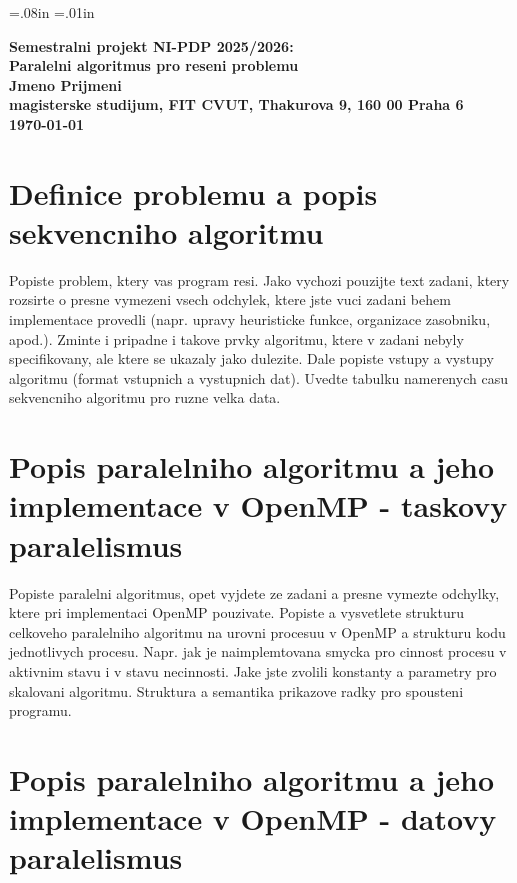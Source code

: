  \oddsidemargin=-5mm
\evensidemargin=-5mm\marginparwidth=.08in \marginparsep=.01in
\marginparpush=5pt\topmargin=-15mm\headheight=12pt
\headsep=25pt\footheight=12pt \footskip=30pt\textheight=25cm
\textwidth=17cm\columnsep=2mm
\columnseprule=1pt\parindent=15pt\parskip=2pt


\begin{center}
\bf Semestralni projekt NI-PDP 2025/2026:\\[5mm]
    Paralelni algoritmus pro reseni problemu\\[5mm] 
       Jmeno Prijmeni\\[2mm]
magisterske studijum, FIT CVUT, Thakurova 9, 160 00 Praha 6\\[2mm]
\today
\end{center}

\section{Definice problemu a popis sekvencniho algoritmu}

Popiste problem, ktery vas program resi. Jako vychozi pouzijte text
zadani, ktery rozsirte o presne vymezeni vsech odchylek, ktere jste
vuci zadani behem implementace provedli 
(napr.  upravy heuristicke funkce, organizace zasobniku,
apod.). Zminte i pripadne i takove prvky algoritmu, ktere v zadani
nebyly specifikovany, ale ktere se ukazaly jako dulezite.  Dale
popiste vstupy a vystupy algoritmu (format vstupnich a vystupnich
dat). Uvedte tabulku namerenych casu sekvencniho algoritmu pro ruzne
velka data.

\section{Popis paralelniho algoritmu a jeho implementace v OpenMP - taskovy paralelismus}

Popiste paralelni algoritmus, opet vyjdete ze zadani a presne vymezte
odchylky, ktere pri implementaci OpenMP pouzivate.
Popiste a vysvetlete strukturu celkoveho
paralelniho algoritmu na urovni procesuu v OpenMP a strukturu kodu
jednotlivych procesu. Napr. jak je naimplemtovana smycka pro cinnost
procesu v aktivnim stavu i v stavu necinnosti. Jake jste zvolili
konstanty a parametry pro skalovani algoritmu. Struktura a semantika
prikazove radky pro spousteni programu.


\section{Popis paralelniho algoritmu a jeho implementace v OpenMP - datovy paralelismus}

